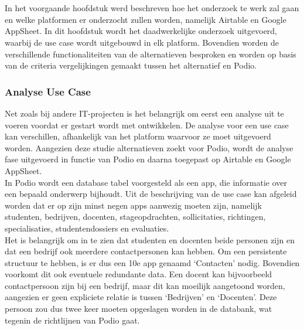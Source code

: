 
\chapter{}%
\label{ch:onderzoek}

In het voorgaande hoofdstuk werd beschreven hoe het onderzoek te werk zal gaan en welke platformen er onderzocht zullen worden, namelijk Airtable en Google AppSheet. In dit hoofdstuk wordt het daadwerkelijke onderzoek uitgevoerd, waarbij de use case wordt uitgebouwd in elk platform. Bovendien worden de verschillende functionaliteiten van de alternatieven besproken en worden op basis van de criteria vergelijkingen gemaakt tussen het alternatief en Podio.

\subsection{Analyse Use Case}

Net zoals bij andere IT-projecten is het belangrijk om eerst een analyse uit te voeren voordat er gestart wordt met ontwikkelen. De analyse voor een use case kan verschillen, afhankelijk van het platform waarvoor ze moet uitgevoerd worden. Aangezien deze studie alternatieven zoekt voor Podio, wordt de analyse fase uitgevoerd in functie van Podio en daarna toegepast op Airtable en Google AppSheet. \\

In Podio wordt een database tabel voorgesteld als een app, die informatie over een bepaald onderwerp bijhoudt. Uit de beschrijving van de use case kan afgeleid worden dat er op zijn minst negen apps aanwezig moeten zijn, namelijk studenten, bedrijven, docenten, stageopdrachten, sollicitaties, richtingen, specialisaties, studentendossiers en evaluaties. \\

Het is belangrijk om in te zien dat studenten en docenten beide personen zijn en dat een bedrijf ook meerdere contactpersonen kan hebben. Om een persistente structuur te hebben, is er dus een 10e app genaamd ‘Contacten’ nodig. Bovendien voorkomt dit ook eventuele redundante data. Een docent kan bijvoorbeeld contactpersoon zijn bij een bedrijf, maar dit kan moeilijk aangetoond worden, aangezien er geen expliciete relatie is tussen ‘Bedrijven’ en ‘Docenten’. Deze persoon zou dus twee keer moeten opgeslagen worden in de databank, wat tegenin de richtlijnen van Podio gaat. \\

